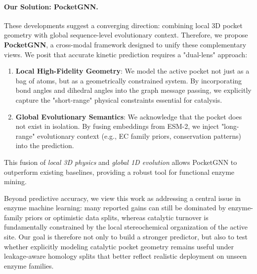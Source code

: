 \documentclass[11pt]{article}
\begin{document}
\paragraph{Our Solution: PocketGNN.}
These developments suggest a converging direction: combining local 3D pocket geometry with global sequence-level evolutionary context. Therefore, we propose \textbf{PocketGNN}, a cross-modal framework designed to unify these complementary views. We posit that accurate kinetic prediction requires a "dual-lens" approach:
\begin{enumerate}
    \item \textbf{Local High-Fidelity Geometry}: We model the active pocket not just as a bag of atoms, but as a geometrically constrained system. By incorporating bond angles and dihedral angles into the graph message passing, we explicitly capture the "short-range" physical constraints essential for catalysis.
    \item \textbf{Global Evolutionary Semantics}: We acknowledge that the pocket does not exist in isolation. By fusing embeddings from ESM-2, we inject "long-range" evolutionary context (e.g., EC family priors, conservation patterns) into the prediction.
\end{enumerate}

This fusion of \emph{local 3D physics} and \emph{global 1D evolution} allows PocketGNN to outperform existing baselines, providing a robust tool for functional enzyme mining.

Beyond predictive accuracy, we view this work as addressing a central issue in enzyme machine learning: many reported gains can still be dominated by enzyme-family priors or optimistic data splits, whereas catalytic turnover is fundamentally constrained by the local stereochemical organization of the active site. Our goal is therefore not only to build a stronger predictor, but also to test whether explicitly modeling catalytic pocket geometry remains useful under leakage-aware homology splits that better reflect realistic deployment on unseen enzyme families.
\end{document}
